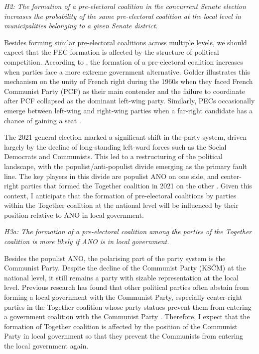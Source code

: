 \documentclass[]{interact}
\theoremstyle{plain}%
\theoremstyle{definition}
\theoremstyle{remark}
\begin{document}
\vspace{12pt}
\textit{H2: The formation of a pre-electoral coalition in the concurrent Senate election increases the probability of the same pre-electoral coalition at the local level in municipalities belonging to a given Senate district.\label{hyp:2}}
\vspace{12pt}

Besides forming similar pre-electoral coalitions across multiple levels, we should expect that the PEC formation is affected by the structure of political competition. 
According to \citet{golder2006}, the formation of a pre-electoral coalition increases when parties face a more extreme government alternative. Golder illustrates this mechanism on the unity of French right during the 1960s when they faced French Communist Party (PCF) as their main contender and the failure to coordinate after PCF collapsed as the dominant left-wing party. Similarly, PECs occasionally emerge between left-wing and right-wing parties when a far-right candidate has a chance of gaining a seat \citep[73]{golder2006}. 

The 2021 general election marked a significant shift in the party system, driven largely by the decline of long-standing left-ward forces such as the Social Democrats and Communists. This led to a restructuring of the political landscape, with the populist/anti-populist divide emerging as the primary fault line. The key players in this
divide are populist ANO on one side, and center-right parties that formed the Together coalition in 2021 on the other \citep{havlik2022}. Given this context, I anticipate that the formation of pre-electoral coalitions by parties within the Together coalition at the national level will be influenced by their position relative to ANO in local government.

\vspace{12pt}
\textit{H3a: The formation of a pre-electoral coalition among the parties of the Together coalition is more likely if ANO is in local government.\label{hyp:3.1}}
\vspace{12pt}

Besides the populist ANO, the polarising part of the party system is the Communist Party.
Despite the decline of the Communist Party (KSČM) at the national level, it still remains a party with sizable representation at the local level. Previous research has found that other political parties often abstain from forming a local government with the Communist Party, especially center-right parties in the Together coalition whose party statues prevent them from entering a government coalition with the Communist Party \citep{skvrnak2021}. Therefore, I expect that the formation of Together coalition is affected by the position of the Communist Party in local government so that they prevent the Communists from entering the local government again.
\end{document}
